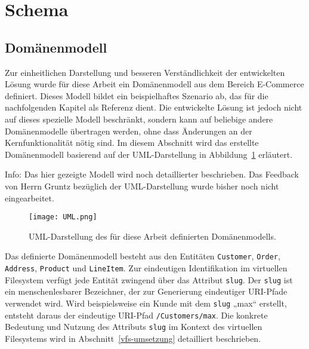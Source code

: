 \section{Schema}
\label{schema}


\subsection{Domänenmodell}
Zur einheitlichen Darstellung und besseren Verständlichkeit der entwickelten Lösung wurde für diese Arbeit ein Domänenmodell aus dem Bereich E-Commerce definiert. Dieses Modell bildet ein beispielhaftes Szenario ab, das für die nachfolgenden Kapitel als Referenz dient. Die entwickelte Lösung ist jedoch nicht auf dieses spezielle Modell beschränkt, sondern kann auf beliebige andere Domänenmodelle übertragen werden, ohne dass Änderungen an der Kernfunktionalität nötig sind. Im diesem Abschnitt wird das erstellte Domänenmodell basierend auf der UML-Darstellung in Abbildung~\ref{fig:uml_modell} erläutert.

Info:
Das hier gezeigte Modell wird noch detaillierter beschrieben. Das Feedback von Herrn Gruntz bezüglich der UML-Darstellung wurde bisher noch nicht eingearbeitet.

\begin{figure}[H]
  \centering
  \texttt{[image: UML.png]}
  \caption{UML-Darstellung des für diese Arbeit definierten Domänenmodells.}
  \label{fig:uml_modell}
\end{figure}

Das definierte Domänenmodell besteht aus den Entitäten \texttt{Customer}, \texttt{Order}, \texttt{Address}, \texttt{Product} und \texttt{LineItem}. Zur eindeutigen Identifikation im virtuellen Filesystem verfügt jede Entität zwingend über das Attribut \texttt{slug}. Der \texttt{slug} ist ein menschenlesbarer Bezeichner, der zur Generierung eindeutiger URI-Pfade verwendet wird. Wird beispielsweise ein Kunde mit dem \texttt{slug} „max“ erstellt, entsteht daraus der eindeutige URI-Pfad \texttt{/Customers/max}. Die konkrete Bedeutung und Nutzung des Attributs \texttt{slug} im Kontext des virtuellen Filesystems wird in Abschnitt~\ref{vfs-umsetzung} detailliert beschrieben.
